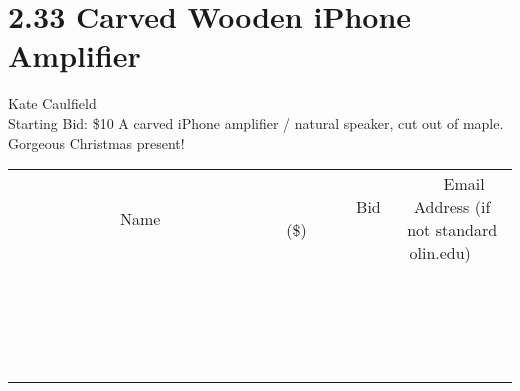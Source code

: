 \documentclass[11pt]{article}
\begin{document}
\section*{2.33 Carved Wooden iPhone Amplifier}
Kate Caulfield
\\
Starting Bid: \$10
\newline
A carved iPhone amplifier / natural speaker, cut out of maple. Gorgeous Christmas present!
\\[3ex]
\begin{tabular}{c c c}
~~~~~~~~~~~~~Name~~~~~~~~~~~~~ & ~~~~~~~~~Bid (\$)~~~~~~~~~  & ~~~Email Address (if not standard olin.edu)~~~\\
 & & \\
\hline
 & & \\
\hline
 & & \\
\hline
 & & \\
\hline
 & & \\
\hline
 & & \\
\hline
 & & \\
\hline
 & & \\
\hline
 & & \\
\hline
 & & \\
\hline
 & & \\
\hline
 & & \\
\hline
 & & \\
\hline
 & & \\
\hline
 & & \\
\hline
 & & \\
\hline
 & & \\
\hline
 & & \\
\hline
 & & \\
\hline
\end{tabular}
\newpage
\end{document}
